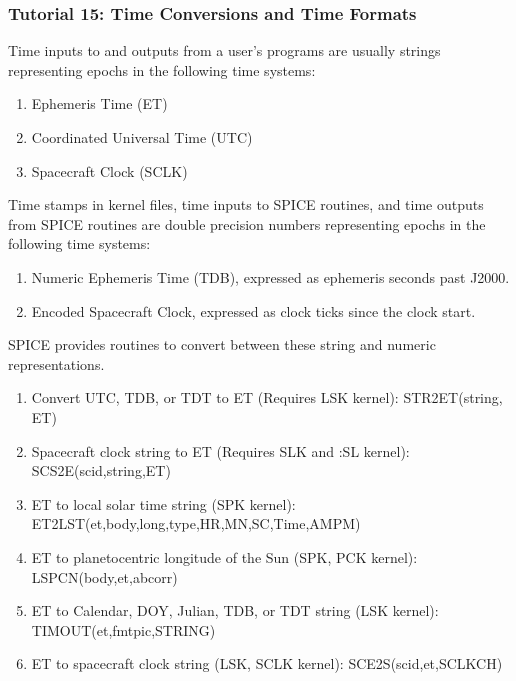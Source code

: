 \documentclass[crop=false,class=book]{standalone}
\begin{document}
\subsubsection{Tutorial 15: Time Conversions and Time Formats}
Time inputs to and outputs from a user's programs are usually strings representing epochs in the following time systems:
\begin{enumerate}
    \item Ephemeris Time (ET)
    \item Coordinated Universal Time (UTC)
    \item Spacecraft Clock (SCLK)
\end{enumerate}
Time stamps in kernel files, time inputs to SPICE routines, and time outputs from SPICE routines are double precision numbers representing epochs in the following time systems:
\begin{enumerate}
    \item Numeric Ephemeris Time (TDB), expressed as ephemeris seconds past J2000.
    \item Encoded Spacecraft Clock, expressed as clock ticks since the clock start.
\end{enumerate}
SPICE provides routines to convert between these string and numeric representations.
\begin{enumerate}
    \item Convert UTC, TDB, or TDT to ET (Requires LSK kernel): STR2ET(string, ET)
    \item Spacecraft clock string to ET (Requires SLK and :SL kernel): SCS2E(scid,string,ET)
    \item ET to local solar time string (SPK kernel): ET2LST(et,body,long,type,HR,MN,SC,Time,AMPM)
    \item ET to planetocentric longitude of the Sun (SPK, PCK kernel): LSPCN(body,et,abcorr)
    \item ET to Calendar, DOY, Julian, TDB, or TDT string (LSK kernel): TIMOUT(et,fmtpic,STRING)
    \item ET to spacecraft clock string (LSK, SCLK kernel): SCE2S(scid,et,SCLKCH)
\end{enumerate}
\end{document}
